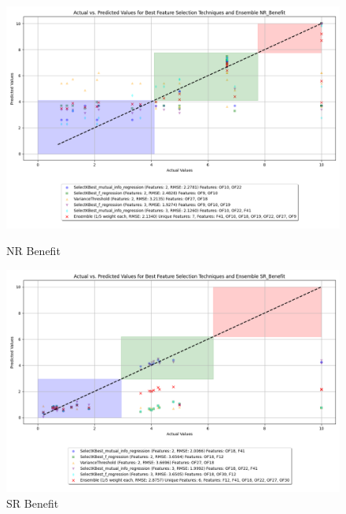 \begin{figure}[H]
    \centering
    \begin{minipage}{0.45\textwidth}
        \centering
        \includegraphics[width=\linewidth]{reg_section_all/images_reg_featred_ensemble/actual_vs_predicted_smallest_feature_selection_and_ensemble_NR_Benefit.png}
        \caption{NR Benefit}
        \label{fig:nr_ben_reg_featred_smallest_ensemble}
    \end{minipage}\hfill
    \begin{minipage}{0.45\textwidth}
        \centering
        \includegraphics[width=\linewidth]{reg_section_all/images_reg_featred_ensemble/actual_vs_predicted_smallest_feature_selection_and_ensemble_SR_Benefit.png}
        \caption{SR Benefit}
        \label{fig:sr_ben_reg_featred_smallest_ensemble}
    \end{minipage}
\end{figure}

